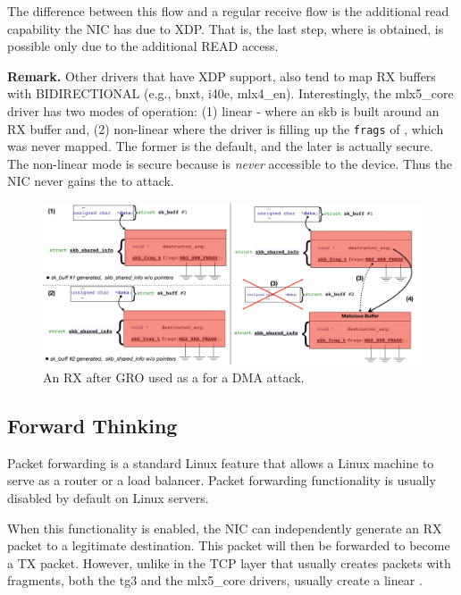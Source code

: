 The difference between this flow and a regular receive flow is the additional read capability the NIC has due to XDP. That is, the last step, where \means{} is obtained, is possible only due to the additional READ access.

\smallskip
\noindent\textbf{Remark.} Other drivers that have XDP support, also tend to map RX buffers with BIDIRECTIONAL (e.g., bnxt, i40e, mlx4\_en). Interestingly, the mlx5\_core driver has two modes of operation: (1) linear - where an skb is built around an RX buffer and, (2) non-linear where the driver is filling up the \texttt{frags} of \shinfo, which was never mapped. The former is the default, and the later is actually secure. The non-linear mode is secure because \shinfo{} is \emph{never} accessible to the device. Thus the NIC never gains the \oportunity{} to attack.

\begin{figure}[t]
    \centering
    \includegraphics[width=\linewidth]{figs/gro.pdf}
    \caption{An RX \skb{} after GRO used as a \means{} for a DMA attack.}
    \label{fig:gro_xdp}
\end{figure}

\subsection{Forward Thinking}\label{sec:forward}

Packet forwarding is a standard Linux feature that allows a Linux machine to serve as a router or a load balancer. Packet forwarding functionality is usually disabled by default on Linux servers.

When this functionality is enabled, the NIC can independently generate an RX packet to a legitimate destination. This packet will then be forwarded to become a TX packet. However, unlike in the TCP layer that usually creates \skb{} packets with fragments, both the tg3 and the mlx5\_core drivers, usually create a linear \skb{}.

